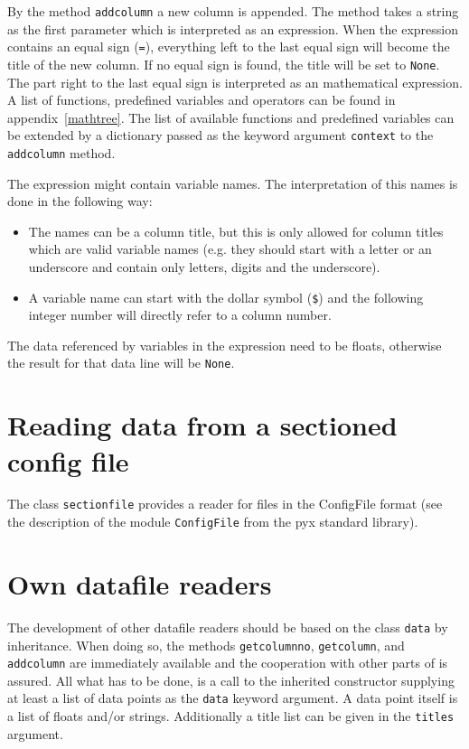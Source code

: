 By the method \verb|addcolumn| a new column is appended. The method
takes a string as the first parameter which is interpreted as an
expression. When the expression contains an equal sign (\verb|=|),
everything left to the last equal sign will become the title of the
new column. If no equal sign is found, the title will be set to
\verb|None|. The part right to the last equal sign is interpreted as
an mathematical expression. A list of functions, predefined variables
and operators can be found in appendix~\ref{mathtree}. The list of
available functions and predefined variables can be extended by a
dictionary passed as the keyword argument \verb|context| to the
\verb|addcolumn| method.

The expression might contain variable names. The interpretation of
this names is done in the following way:
\begin{itemize}
\item The names can be a column title, but this is only allowed for
column titles which are valid variable names (e.g. they should start
with a letter or an underscore and contain only letters, digits and
the underscore).
\item A variable name can start with the dollar symbol (\verb|$|) and
the following integer number will directly refer to a column number.
\end{itemize}
The data referenced by variables in the expression need to be
floats, otherwise the result for that data line will be \verb|None|.

\section{Reading data from a sectioned config file}

The class \verb|sectionfile| provides a reader for files in the
ConfigFile format (see the description of the module \verb|ConfigFile|
from the pyx standard library).

\section{Own datafile readers}

The development of other datafile readers should be based on the
class \verb|data| by inheritance. When doing so, the methods
\verb|getcolumnno|, \verb|getcolumn|, and \verb|addcolumn| are
immediately available and the cooperation with other parts of \PyX{}
is assured. All what has to be done, is a call to the inherited
constructor supplying at least a list of data points as the
\verb|data| keyword argument. A data point itself is a list of floats
and/or strings. Additionally a title list can be given in the
\verb|titles| argument.
